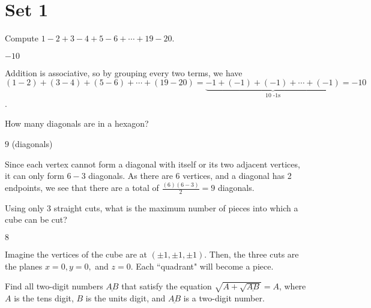 \documentclass[11pt]{article}
\begin{document}
\section*{Set 1}

\begin{problem}
Compute $1 - 2 + 3 - 4 + 5 - 6 + \cdots + 19 - 20$.
\end{problem}

\begin{answer}
$\boxed{-10}$
\end{answer}

\begin{solution}
Addition is associative, so by grouping every two terms, we have $(1 - 2) + (3 - 4) + (5 - 6) + \cdots + (19 - 20) = \underbrace{-1 + (-1) + (-1) + \cdots + (-1)}_{\text{10 -1s}} = \boxed{-10}$.
\end{solution}


\begin{problem}%
How many diagonals are in a hexagon?
\end{problem}

\begin{answer}
$\boxed{9}$ (diagonals)
\end{answer}

\begin{solution}
Since each vertex cannot form a diagonal with itself or its two adjacent vertices, it can only form $6-3$ diagonals. As there are 6 vertices, and a diagonal has 2 endpoints, we see that there are a total of $\frac{(6)(6-3)}{2}=\boxed{9}$ diagonals.
\end{solution}


\begin{problem}%
Using only 3 straight cuts, what is the maximum number of pieces into which a cube can be cut?
\end{problem}

\begin{answer}
$\boxed{8}$
\end{answer}

\begin{solution}
Imagine the vertices of the cube are at $(\pm 1, \pm 1, \pm 1)$. Then, the three cuts are the planes $x=0, y=0,$ and $z=0$. Each ``quadrant" will become a piece.
\end{solution}


\begin{problem}%
Find all two-digit numbers $\underline{AB}$ that satisfy the equation $\sqrt{A + \sqrt{\underline{AB}}} = A$, where $A$ is the tens digit, $B$ is the units digit, and $\underline{AB}$ is a two-digit number.
\end{problem}
\end{document}
